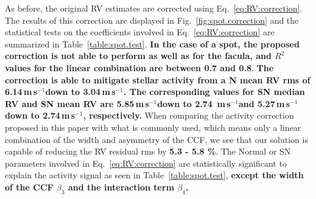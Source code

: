 \documentclass{aa}
\def\ms{\hbox{\,m\,s$^{-1}$}}         %
\begin{document}
As before, the original RV estimates are corrected using Eq.~\eqref{eq:RV:correction}. 
The results of this correction are displayed in Fig.~\ref{fig:spot.correction} and the statistical tests on the coefficients involved in Eq.~\eqref{eq:RV:correction} are summarized in Table~\ref{table:spot.test}. 
{\bf In the case of a spot, the proposed correction is not able to perform as well as for the facula, and $R^2$ values for the linear combination are between 0.7 and 0.8}. 
{\bf The correction is able to mitigate stellar activity from a N mean RV rms of 6.14\ms down to 3.04\ms. The corresponding values for SN median RV and SN mean RV are 5.85\ms down to 2.74 \ms and 5.27\ms down to 2.74\ms, respectively.}
When comparing the activity correction proposed in this paper with what is commonly used, which means only a linear combination of the width and asymmetry of the CCF, we see that our solution is capable of reducing the RV residual rms by {\bf{5.3 - 5.8 \%}}.
The Normal or SN parameters involved in Eq.~\eqref{eq:RV:correction} are statistically significant to explain the activity signal as seen in Table~\ref{table:spot.test}, {\bf except the width of the CCF $\beta_3$ and the interaction term $\beta_4$.}
\end{document}
